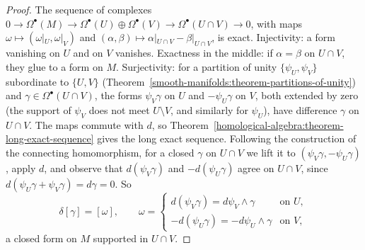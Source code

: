 \begin{proof}
The sequence of complexes $0 \to \Omega^\bullet(M) \to \Omega^\bullet(U) \oplus \Omega^\bullet(V) \to \Omega^\bullet(U \cap V) \to 0$, with maps $\omega \mapsto (\omega|_U, \omega|_V)$ and
$(\alpha, \beta) \mapsto \alpha|_{U \cap V} - \beta|_{U \cap V}$, is exact. Injectivity: a form vanishing on $U$ and on $V$ vanishes. Exactness in the middle: if $\alpha = \beta$ on $U \cap V$, they
glue to a form on $M$. Surjectivity: for a partition of unity $\{\psi_U, \psi_V\}$ subordinate to $\{U, V\}$ (Theorem~\ref{smooth-manifolds:theorem-partitions-of-unity}) and
$\gamma \in \Omega^\bullet(U \cap V)$, the forms $\psi_V\gamma$ on $U$ and $-\psi_U\gamma$ on $V$, both extended by zero (the support of $\psi_V$ does not meet $U \setminus V$, and similarly for
$\psi_U$), have difference $\gamma$ on $U \cap V$. The maps commute with $d$, so Theorem~\ref{homological-algebra:theorem-long-exact-sequence} gives the long exact sequence. Following the
construction of the connecting homomorphism, for a closed $\gamma$ on $U \cap V$ we lift it to $(\psi_V\gamma, -\psi_U\gamma)$, apply $d$, and observe that $d(\psi_V\gamma)$ and
$-d(\psi_U\gamma)$ agree on $U \cap V$, since $d(\psi_U\gamma + \psi_V\gamma) = d\gamma = 0$. So
\[
\delta[\gamma] = [\omega], \qquad \omega = \begin{cases} d(\psi_V\gamma) = d\psi_V \wedge \gamma & \text{on } U,\\ -d(\psi_U\gamma) = -d\psi_U \wedge \gamma & \text{on } V,\end{cases}
\]
a closed form on $M$ supported in $U \cap V$.
\end{proof}

